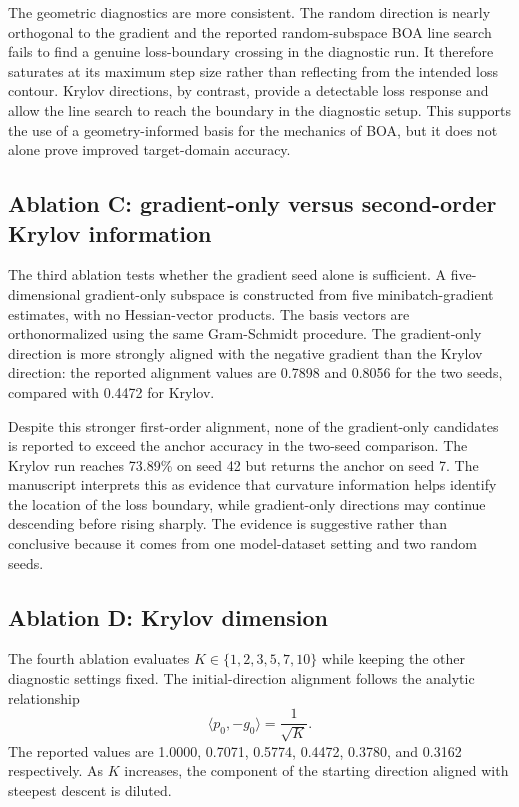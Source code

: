 \documentclass[11pt,a4paper]{article}
\begin{document}
The geometric diagnostics are more consistent. The random direction is nearly orthogonal to the gradient and the reported random-subspace BOA line search fails to find a genuine loss-boundary crossing in the diagnostic run. It therefore saturates at its maximum step size rather than reflecting from the intended loss contour. Krylov directions, by contrast, provide a detectable loss response and allow the line search to reach the boundary in the diagnostic setup. This supports the use of a geometry-informed basis for the mechanics of BOA, but it does not alone prove improved target-domain accuracy.

\subsection{Ablation C: gradient-only versus second-order Krylov information}
The third ablation tests whether the gradient seed alone is sufficient. A five-dimensional gradient-only subspace is constructed from five minibatch-gradient estimates, with no Hessian-vector products. The basis vectors are orthonormalized using the same Gram-Schmidt procedure. The gradient-only direction is more strongly aligned with the negative gradient than the Krylov direction: the reported alignment values are 0.7898 and 0.8056 for the two seeds, compared with 0.4472 for Krylov.

Despite this stronger first-order alignment, none of the gradient-only candidates is reported to exceed the anchor accuracy in the two-seed comparison. The Krylov run reaches 73.89\% on seed 42 but returns the anchor on seed 7. The manuscript interprets this as evidence that curvature information helps identify the location of the loss boundary, while gradient-only directions may continue descending before rising sharply. The evidence is suggestive rather than conclusive because it comes from one model-dataset setting and two random seeds.

\subsection{Ablation D: Krylov dimension}
The fourth ablation evaluates $K\in\{1,2,3,5,7,10\}$ while keeping the other diagnostic settings fixed. The initial-direction alignment follows the analytic relationship
\begin{equation}
 \langle p_0,-g_0\rangle=\frac{1}{\sqrt{K}}.
 \label{eq:k_alignment}
\end{equation}
The reported values are 1.0000, 0.7071, 0.5774, 0.4472, 0.3780, and 0.3162 respectively. As $K$ increases, the component of the starting direction aligned with steepest descent is diluted.
\end{document}
